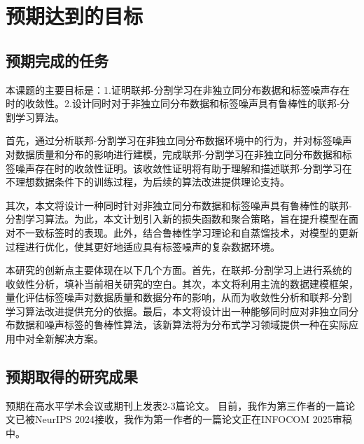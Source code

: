 \chapter{预期达到的目标}
\section{预期完成的任务}
本课题的主要目标是：1.证明联邦-分割学习在非独立同分布数据和标签噪声存在时的收敛性。2.设计同时对于非独立同分布数据和标签噪声具有鲁棒性的联邦-分割学习算法。

首先，通过分析联邦-分割学习在非独立同分布数据环境中的行为，并对标签噪声对数据质量和分布的影响进行建模，完成联邦-分割学习在非独立同分布数据和标签噪声存在时的收敛性证明。该收敛性证明将有助于理解和描述联邦-分割学习在不理想数据条件下的训练过程，为后续的算法改进提供理论支持。

其次，本文将设计一种同时针对非独立同分布数据和标签噪声具有鲁棒性的联邦-分割学习算法。为此，本文计划引入新的损失函数和聚合策略，旨在提升模型在面对不一致标签时的表现。此外，结合鲁棒性学习理论和自蒸馏技术，对模型的更新过程进行优化，使其更好地适应具有标签噪声的复杂数据环境。

本研究的创新点主要体现在以下几个方面。首先，在联邦-分割学习上进行系统的收敛性分析，填补当前相关研究的空白。其次，本文将利用主流的数据建模框架，量化评估标签噪声对数据质量和数据分布的影响，从而为收敛性分析和联邦-分割学习算法改进提供充分的依据。最后，本文将设计出一种能够同时应对非独立同分布数据和噪声标签的鲁棒性算法，该新算法将为分布式学习领域提供一种在实际应用中对全新解决方案。

\section{预期取得的研究成果}
预期在高水平学术会议或期刊上发表2-3篇论文。
目前，我作为第三作者的一篇论文已被NeurIPS 2024接收，我作为第一作者的一篇论文正在INFOCOM 2025审稿中。